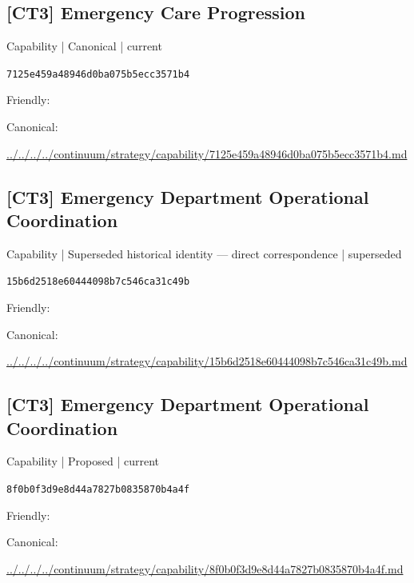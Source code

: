 \documentclass[10pt,a4paper]{article}
\begin{document}
\subsection*{[CT3] Emergency Care Progression}
{\small Capability | Canonical | current}\par
\texttt{7125e459a48946d0ba075b5ecc3571b4}\par
Friendly: \par
Canonical: \par
{\footnotesize\url{../../../../continuum/strategy/capability/7125e459a48946d0ba075b5ecc3571b4.md}}\par
\subsection*{[CT3] Emergency Department Operational Coordination}
{\small Capability | Superseded historical identity — direct correspondence | superseded}\par
\texttt{15b6d2518e60444098b7c546ca31c49b}\par
Friendly: \par
Canonical: \par
{\footnotesize\url{../../../../continuum/strategy/capability/15b6d2518e60444098b7c546ca31c49b.md}}\par
\subsection*{[CT3] Emergency Department Operational Coordination}
{\small Capability | Proposed | current}\par
\texttt{8f0b0f3d9e8d44a7827b0835870b4a4f}\par
Friendly: \par
Canonical: \par
{\footnotesize\url{../../../../continuum/strategy/capability/8f0b0f3d9e8d44a7827b0835870b4a4f.md}}\par
\end{document}
